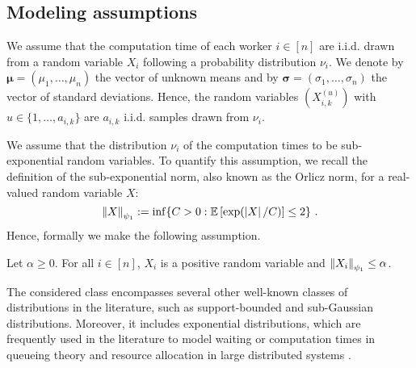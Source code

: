 \subsection{Modeling assumptions}
We assume that the computation time of each worker $i \in [n]$ are i.i.d. drawn from a random variable $X_i$ following a probability distribution $\nu_i$.
We denote by $\bm{\mu} = (\mu_1, \dots, \mu_n)$ the vector of unknown means and by $\bm{\sigma} = (\sigma_1, \dots, \sigma_n)$ the vector of standard deviations.
Hence, the random variables $(X_{i,k}^{(u)})$ with $u \in \{1, \dots, a_{i,k}\}$ are $a_{i,k}$ i.i.d. samples drawn from $\nu_i$.

We assume that the distribution $\nu_i$ of the computation times to be sub-exponential random variables. To quantify this assumption, we recall the definition of the sub-exponential norm, also known as the Orlicz norm, for a real-valued random variable $X$:
\begin{equation}\label{eq:def_se}
	\left\| X \right\|_{\psi_1} := \inf\{C > 0: \mathbb{E}\left[\exp(\left| X \right|/C)\right] \le 2\}~.
\end{equation}
Hence, formally we make the following assumption.
\begin{assumption}\label{a:sube}
	Let $\alpha \geq 0$. For all $i \in [n]$, $X_{i}$ is a positive random variable and $\left\| X_{i} \right\|_{\psi_1} \le \alpha$.
\end{assumption}

The considered class encompasses several other well-known classes of distributions in the literature, such as support-bounded and sub-Gaussian distributions.
Moreover, it includes exponential distributions, which are frequently used in the literature to model waiting or computation times in queueing theory and resource allocation in large distributed systems \cite{gelenbe2010analysis, gross2011fundamentals,hadjis2016omnivore, mitliagkas2016asynchrony, dutta2018slow, nguyen2022federated}.

 

